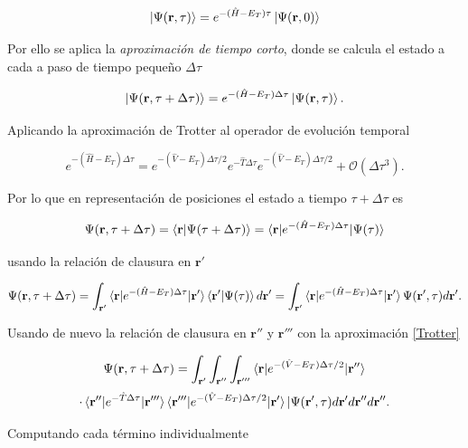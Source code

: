 \documentclass[11pt,a4paper,twoside,pdf]{article}
\numberwithin{equation}{section}
\begin{document}
$$
    \ket{\Psi(\mathbf{r}, \tau)} = e^{-(\hat{H}-E_T)\tau} \ket{\Psi(\mathbf{r}, 0)}
$$

Por ello se aplica la \textit{aproximación de tiempo corto}, donde se calcula el estado a cada a paso de tiempo pequeño $\Delta \tau$

$$
    \ket{\Psi(\mathbf{r}, \tau + \Delta \tau)} = e^{-(\hat{H}-E_T)\Delta \tau} \ket{\Psi(\mathbf{r}, \tau)}.
$$

Aplicando la aproximación de Trotter al operador de evolución temporal \cite{kalos2008monte}

\begin{equation}
    e^{-(\hat{H}-E_T)\Delta \tau} = e^{-(\hat{V}-E_T)\Delta \tau/2}e^{-\hat{T}\Delta \tau}e^{-(\hat{V}-E_T)\Delta \tau /2} + \mathcal{O} (\Delta \tau^3).
\label{Trotter}
\end{equation}
    


Por lo que en representación de posiciones el estado a tiempo $\tau + \Delta \tau$ es

$$
    \Psi(\mathbf{r}, \tau + \Delta \tau) = \braket{\mathbf{r}|\Psi(\tau + \Delta \tau)} =  \braket{\mathbf{r}| e^{-(\hat{H}-E_T)\Delta \tau} | \Psi( \tau)}
$$

usando la relación de clausura en $\mathbf{r'}$

$$
    \Psi(\mathbf{r}, \tau + \Delta \tau) =\int_{\mathbf{r'}} \braket{\mathbf{r}| e^{-(\hat{H}-E_T)\Delta \tau} | \mathbf{r'}} \braket{{\mathbf{r'}} |\Psi( \tau )} d\mathbf{r'}
    = \int_{\mathbf{r'}} \braket{\mathbf{r}| e^{-(\hat{H}-E_T)\Delta \tau} | \mathbf{r'}} \Psi(\mathbf{r'}, \tau ) d\mathbf{r'}.
$$

Usando de nuevo la relación de clausura en $\mathbf{r''}$ y $\mathbf{r'''}$ con la aproximación \ref{Trotter}


$$
    \Psi(\mathbf{r}, \tau + \Delta \tau) =
    \int_{\mathbf{r'}} \int_{\mathbf{r''}} \int_{\mathbf{r'''}}
    \braket{\mathbf{r}| e^{-(\hat{V}-E_T)\Delta \tau/2} | \mathbf{r''}} 
$$
$$
    \cdot \braket{\mathbf{r''}| e^{-\hat{T}\Delta \tau} | \mathbf{r'''}}
    \braket{\mathbf{r'''}|e^{-(\hat{V}-E_T)\Delta \tau/2} | \mathbf{r'}}
    |\Psi(\mathbf{r'}, \tau ) 
    d\mathbf{r'} d\mathbf{r''} d\mathbf{r''}.
$$

Computando cada término individualmente
\end{document}
